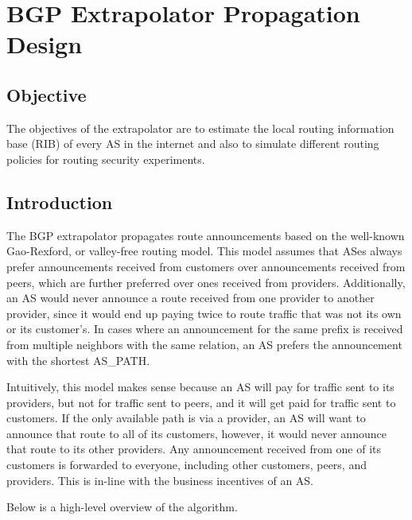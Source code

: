 \documentclass[letterpaper]{article}
\date{}
\begin{document}
\hypertarget{bgp-extrapolator-propagation-design}{%
\section{BGP Extrapolator Propagation Design
}\label{bgp-extrapolator-propagation-design}}

\hypertarget{objective}{%
\subsection{Objective}\label{objective}}

The objectives of the extrapolator are to estimate the local routing
information base (RIB) of every AS in the internet and also to simulate
different routing policies for routing security experiments.

\hypertarget{introduction}{%
\subsection{Introduction}\label{introduction}}

The BGP extrapolator propagates route announcements based on the
well-known Gao-Rexford, or valley-free routing model. This model assumes
that ASes always prefer announcements received from customers over
announcements received from peers, which are further preferred over ones
received from providers. Additionally, an AS would never announce a
route received from one provider to another provider, since it would end
up paying twice to route traffic that was not its own or its customer's.
In cases where an announcement for the same prefix is received from
multiple neighbors with the same relation, an AS prefers the
announcement with the shortest AS\_PATH.

Intuitively, this model makes sense because an AS will pay for traffic
sent to its providers, but not for traffic sent to peers, and it will
get paid for traffic sent to customers. If the only available path is
via a provider, an AS will want to announce that route to all of its
customers, however, it would never announce that route to its other
providers. Any announcement received from one of its customers is
forwarded to everyone, including other customers, peers, and providers.
This is in-line with the business incentives of an AS.

Below is a high-level overview of the algorithm.
\end{document}
